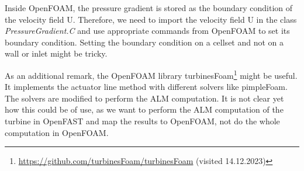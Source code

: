 Inside OpenFOAM, the pressure gradient is stored as the boundary condition of the velocity field U. Therefore, we need to import the velocity field U in the class \textit{PressureGradient.C} and use appropriate commands from OpenFOAM to set its boundary condition. Setting the boundary condition on a cellset and not on a wall or inlet might be tricky.

As an additional remark, the OpenFOAM library turbinesFoam\footnote{\url{https://github.com/turbinesFoam/turbinesFoam} (visited 14.12.2023)} \cite{Bachant:2018} might be useful. It implements the actuator line method with different solvers like pimpleFoam. The solvers are modified to perform the ALM computation. It is not clear yet how this could be of use, as we want to perform the ALM computation of the turbine in OpenFAST and map the results to OpenFOAM, not do the whole computation in OpenFOAM.

